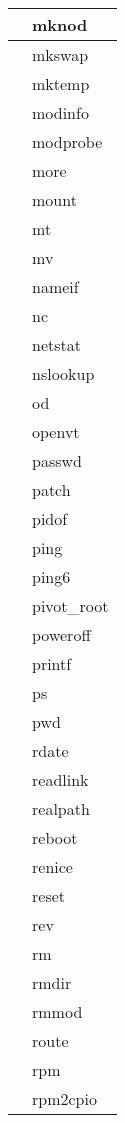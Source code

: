 \begin{longtable}{p{100mm}p{100mm}}
     \hline
      & mknod \\
     \hline
      & mkswap \\
     \hline
      & mktemp \\
     \hline
      & modinfo \\
     \hline
      & modprobe \\
     \hline
      & more \\
     \hline
      & mount \\
     \hline
      & mt \\
     \hline
      & mv \\
     \hline
      & nameif \\
     \hline
      & nc \\
     \hline
      & netstat \\
     \hline
      & nslookup \\
     \hline
      & od \\
     \hline
      & openvt \\
     \hline
      & passwd \\
     \hline
      & patch \\
     \hline
      & pidof \\
     \hline
      & ping \\
     \hline
      & ping6 \\
     \hline
      & pivot\_root \\
     \hline
      & poweroff \\
     \hline
      & printf \\
     \hline
      & ps \\
     \hline
      & pwd \\
     \hline
      & rdate \\
     \hline
      & readlink \\
     \hline
      & realpath \\
     \hline
      & reboot \\
     \hline
      & renice \\
     \hline
      & reset \\
     \hline
      & rev \\
     \hline
      & rm \\
     \hline
      & rmdir \\
     \hline
      & rmmod \\
     \hline
      & route \\
     \hline
      & rpm \\
     \hline
      & rpm2cpio \\

\end{longtable}
